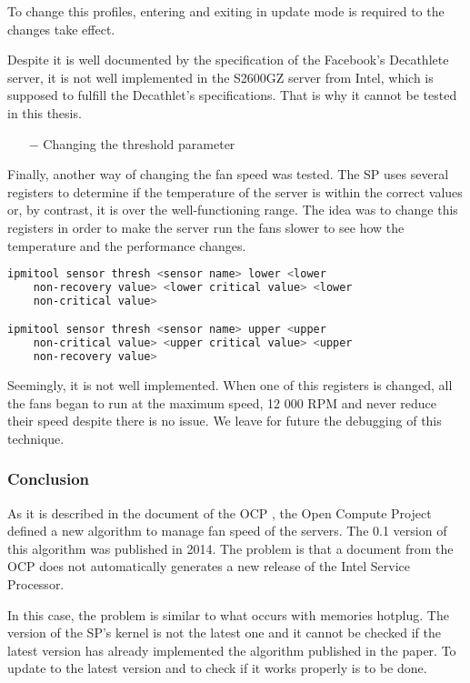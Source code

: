 To change this profiles, entering and exiting in update mode is required to the changes take effect.

Despite it is well documented by the specification of the Facebook's Decathlete server, it is not well implemented in the S2600GZ server from Intel, which is supposed to fulfill the Decathlet's specifications. That is why it cannot be tested in this thesis.

\begin{itemize}
    \item[$-$] Changing the threshold parameter
\end{itemize}

Finally, another way of changing the fan speed was tested. The SP uses several registers to determine if the temperature of the server is within the correct values or, by contrast, it is over the well-functioning range. The idea was to change this registers in order to make the server run the fans slower to see how the temperature and the performance changes.

\begin{lstlisting}[language=Bash]
ipmitool sensor thresh <sensor name> lower <lower 
    non-recovery value> <lower critical value> <lower
    non-critical value>

ipmitool sensor thresh <sensor name> upper <upper
    non-critical value> <upper critical value> <upper
    non-recovery value>
\end{lstlisting}

Seemingly, it is not well implemented. When one of this registers is changed, all the fans began to run at the maximum speed, 12 000 RPM and never reduce their speed despite there is no issue. We leave for future the debugging of this technique.

\subsubsection{Conclusion}

As it is described in the document of the OCP \cite{fanspeed}, the Open Compute Project defined a new algorithm to manage fan speed of the servers. The 0.1 version of this algorithm was published in 2014. The problem is that a document from the OCP does not automatically generates a new release of the Intel Service Processor.

In this case, the problem is similar to what occurs with memories hotplug. The version of the SP's kernel is not the latest one and it cannot be checked if the latest version has already implemented the algorithm published in the paper. To update to the latest version and to check if it works properly is to be done.


